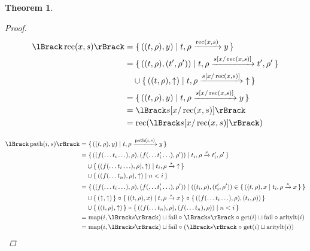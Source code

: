 \documentclass{article}
\newtheorem{theorem}{Theorem}
\newcommand{\fail}{\ensuremath \text{$\uparrow$}}
\newcommand{\fix}[2]{\ensuremath \operatorname{rec}(#1,#2)}
\newcommand{\path}[2]{\ensuremath \operatorname{path}(#1,#2)}
\newcommand{\subst}[3]{\ensuremath #1[#2 / #3]}
\newcommand{\transform}[5]{#1, #2 \xrightarrow{#3} #4, #5}
\newcommand{\transformx}[4]{#1, #2 \xrightarrow{#3} #4}
\newcommand{\transformfail}[3]{#1, #2 \xrightarrow{#3} \fail}
\newcommand{\sem}[1]{\ensuremath \lBrack #1 \rBrack}
\newcommand{\setbuild}[2]{\ensuremath \{\, #1 \mid #2 \,\}}
\newcommand{\setbuildc}[1]{\ensuremath \{\, #1 \,\}}
\newcommand{\lfail}{\ensuremath \operatorname{fail}}
\newcommand{\get}{\ensuremath \operatorname{get}}
\newcommand{\map}{\ensuremath \operatorname{map}}
\newcommand{\aritylt}{\ensuremath \operatorname{aritylt}}
\newcommand{\comp}{\ensuremath \mathrel{\circ}}
\newcommand{\lfix}{\ensuremath \operatorname{rec}}
\begin{document}
\begin{theorem}
\begin{proof}
\begin{align*}
  \sem{\fix{x}{s}}
    &= {\setbuild{((t,\rho),y)}{\transformx{t}{\rho}{\fix{x}{s}}{y}}} \\
    &= {\setbuild{((t,\rho),(t',\rho'))}{\transform{t}{\rho}{\subst{s}{x}{\fix{x}{s}}}{t'}{\rho'}}} \\
    &\quad \cup {\setbuild{((t,\rho),\fail)}{\transformfail{t}{\rho}{\subst{s}{x}{\fix{x}{s}}}}} \\
    &= {\setbuild{((t,\rho),y)}{\transformx{t}{\rho}{\subst{s}{x}{\fix{x}{s}}}{y}}} \\
    &= \sem{\subst{s}{x}{\fix{x}{s}}} \\
    &= \lfix(\sem{\subst{s}{x}{\fix{x}{s}}})
\end{align*}

\begin{align*}
  \sem{\path{i}{s}}
    &= \setbuild{((t,\rho),y)}{\transformx{t}{\rho}{\path{i}{s}}{y}} \\
    &= \setbuild{((f(\ldots t_i \ldots),\rho),(f(\ldots t_i' \ldots),\rho'))}{\transform{t_i}{\rho}{s}{t_i'}{\rho'}} \\
    &\quad \cup {\setbuild{((f(\ldots t_i \ldots),\rho),\fail)}{\transformfail{t_i}{\rho}{s}}} \\
    &\quad \cup {\setbuild{((f(\ldots t_n),\rho),\fail)}{ n < i }} \\
    &= \setbuild{ ((f(\ldots t_i \ldots),\rho),(f(\ldots t_i' \ldots),\rho')) }{ ((t_i,\rho),(t_i',\rho')) \in \setbuild{ ((t,\rho),x }{ \transformx{t_i}{\rho}{s}{x} } } \\
    &\quad \cup \setbuildc{ (\fail,\fail)} \comp {\setbuild{((t,\rho),x)}{\transformx{t}{\rho}{s}{x}}} \comp {\setbuildc{((f(\ldots t_i \ldots),\rho),(t_i,\rho))}} \\
    &\quad \cup \setbuildc{((t,\rho),\fail)} \comp \setbuild{((f(\ldots t_n),\rho),(f(\ldots t_n),\rho))}{ n < i } \\
    &= \map(i,\sem{s}) \sqcup \lfail \comp \sem{s} \comp \get(i) \sqcup \lfail \comp \aritylt(i) \\
    &= \map(i,\sem{s}) \sqcup \lfail \comp (\sem{s} \comp \get(i) \sqcup \aritylt(i))
\end{align*}


\end{proof}
\end{theorem}
\end{document}
